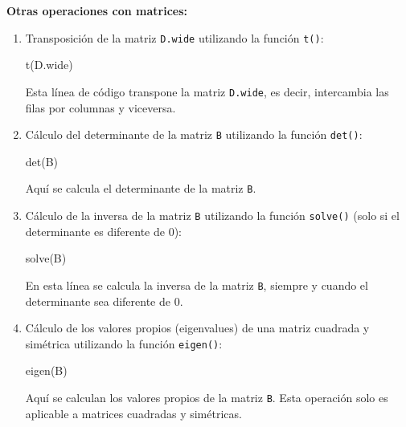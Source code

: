 \documentclass[
  jou,
  floatsintext,
  longtable,
  a4paper,
  nolmodern,
  notxfonts,
  notimes,
  colorlinks=true,linkcolor=blue,citecolor=blue,urlcolor=blue]{apa7}
\newenvironment{Shaded}{\begin{snugshade}}{\end{snugshade}}
\newcommand{\FunctionTok}[1]{\textcolor[rgb]{0.28,0.35,0.67}{#1}}
\newcommand{\NormalTok}[1]{\textcolor[rgb]{0.00,0.23,0.31}{#1}}
\begin{document}
\textbf{Otras operaciones con matrices:}

\begin{enumerate}
\def\labelenumi{\arabic{enumi}.}
\item
  Transposición de la matriz \texttt{D.wide} utilizando la función
  \texttt{t()}:

\begin{Shaded}
\begin{Highlighting}[]
\FunctionTok{t}\NormalTok{(D.wide)}
\end{Highlighting}
\end{Shaded}

  Esta línea de código transpone la matriz \texttt{D.wide}, es decir,
  intercambia las filas por columnas y viceversa.
\item
  Cálculo del determinante de la matriz \texttt{B} utilizando la función
  \texttt{det()}:

\begin{Shaded}
\begin{Highlighting}[]
\FunctionTok{det}\NormalTok{(B)}
\end{Highlighting}
\end{Shaded}

  Aquí se calcula el determinante de la matriz \texttt{B}.
\item
  Cálculo de la inversa de la matriz \texttt{B} utilizando la función
  \texttt{solve()} (solo si el determinante es diferente de 0):

\begin{Shaded}
\begin{Highlighting}[]
\FunctionTok{solve}\NormalTok{(B)}
\end{Highlighting}
\end{Shaded}

  En esta línea se calcula la inversa de la matriz \texttt{B}, siempre y
  cuando el determinante sea diferente de 0.
\item
  Cálculo de los valores propios (eigenvalues) de una matriz cuadrada y
  simétrica utilizando la función \texttt{eigen()}:

\begin{Shaded}
\begin{Highlighting}[]
\FunctionTok{eigen}\NormalTok{(B)}
\end{Highlighting}
\end{Shaded}

  Aquí se calculan los valores propios de la matriz \texttt{B}. Esta
  operación solo es aplicable a matrices cuadradas y simétricas.
\end{enumerate}
\end{document}
